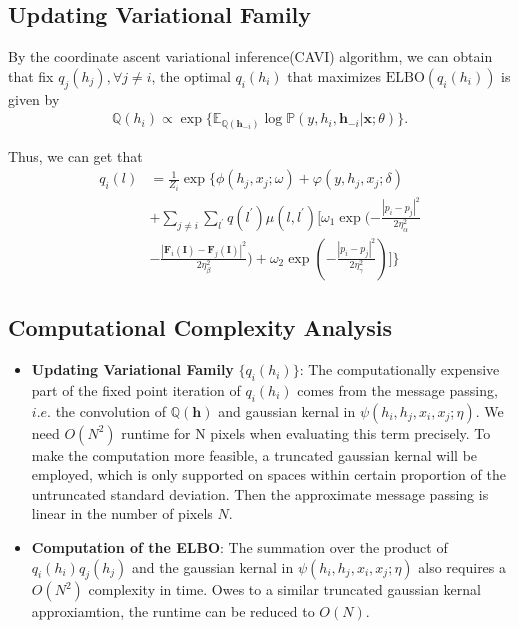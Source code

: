 \documentclass[conference]{IEEEtran}
\newcommand{\E}{{\mathbb E}}
\newcommand{\PP}{{\mathbb P}}
\begin{document}
\subsection{\textbf{Updating Variational Family}}
By the coordinate ascent variational inference(CAVI) algorithm, we can obtain that fix \(q_{j}(h_{j}), \forall j \neq i\), the optimal \(q_{i}(h_{i})\) that maximizes \(\textrm{ELBO}(q_{i}(h_{i}))\) is given by
\begin{align}
	\mathbb{Q}(h_{i}) \propto \exp\{ \E_{\mathbb{Q}({\mathbf{h}_{-i}})} \log \PP (y, h_{i}, \mathbf{h}_{-i}|\mathbf{x}; \theta)\}.
\end{align}

Thus, we can get that
\begin{align}
	q_{i}(l) &= \frac{1}{Z_{i}} \exp \Big\{\phi(h_{j}, x_{j}; \omega) + \varphi
	(y, h_{j}, x_{j}; \delta) \\
	& +  \sum_{j\neq i } \sum_{l^{'}}  q(l^{'})\mu(l, l^{'}) 
	\Big[ \omega_{1} 
	\exp ( - \frac{\left\lvert p_{i} - p_{j} \right\rvert^{2} }{2 \eta_{\alpha}^{2}}\\
	&
	 - \frac{\left\lvert \mathbf{F}_{i}(\mathbf{I}) - \mathbf{F}_{j}(\mathbf{I}) \right\rvert^{2} }{2 \eta_{\beta}^{2}})  + \omega_{2}\exp ( - \frac{\left\lvert p_{i} - p_{j} \right\rvert^{2}}{2 \eta_{\gamma}^{2}})\Big]
	 \Big\}
\end{align}

\subsection{\textbf{Computational Complexity Analysis}}
\noindent
\begin{itemize}
	\item {\textbf{Updating Variational Family}} \(\{q_{i}(h_{i})\}\): The computationally expensive part of the fixed point iteration of \(q_{i}(h_i)\) comes
	 from the message passing, \(i.e\). the convolution of \(\mathbb{Q}(\mathbf{h})\) and gaussian kernal in \(\psi(h_{i}, h_{j}, x_{i}, x_{j}; \eta)\). We need \(O(N^{2})\) runtime for N pixels when evaluating this term precisely.
	 To make the computation more feasible, a truncated gaussian kernal will be employed, which is only supported on spaces within certain proportion of the untruncated standard deviation. Then the approximate message passing is linear in the number of pixels \(N\).
	\item {\textbf{Computation of the ELBO}}: The summation over the product of \(q_{i}(h_{i})q_{j}(h_{j})\) and the gaussian kernal in \(\psi(h_{i}, h_{j}, x_{i}, x_{j}; \eta)\) also requires a \(O(N^{2})\) complexity in time. 
	Owes to a similar truncated gaussian kernal approxiamtion, the runtime can be reduced to \(O(N)\).
\end{itemize}

\citep{huang2015bidirectional}




\end{document}
